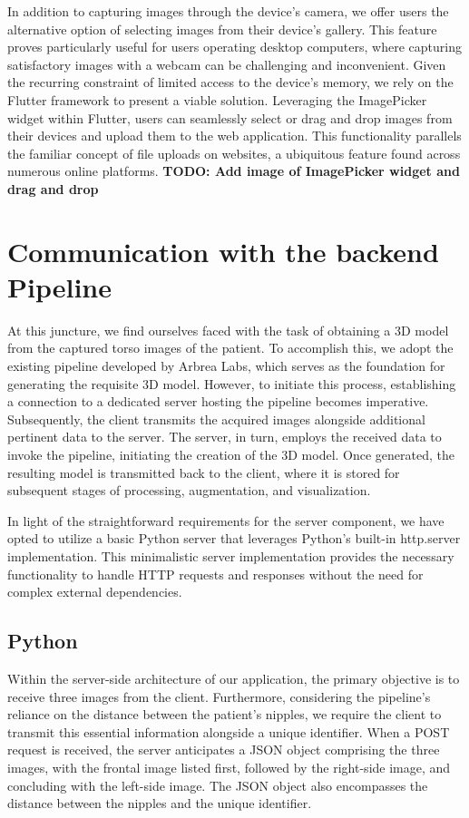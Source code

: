 In addition to capturing images through the device's camera, we offer users the alternative option of selecting images from their device's gallery. This feature proves particularly useful 
for users operating desktop computers, where capturing satisfactory images with a webcam can be challenging and inconvenient. Given the recurring constraint of limited access to the device's memory, 
we rely on the Flutter framework to present a viable solution. Leveraging the ImagePicker widget within Flutter, users can seamlessly select or drag and drop images from their devices 
and upload them to the web application. This functionality parallels the familiar concept of file uploads on websites, a ubiquitous feature found across numerous online platforms. 
\textbf{TODO: Add image of ImagePicker widget and drag and drop}

\section{Communication with the backend Pipeline}

At this juncture, we find ourselves faced with the task of obtaining a 3D model from the captured torso images of the patient. To accomplish this, we adopt the existing pipeline developed by Arbrea Labs, 
which serves as the foundation for generating the requisite 3D model. However, to initiate this process, establishing a connection to a dedicated server hosting the pipeline becomes imperative. 
Subsequently, the client transmits the acquired images alongside additional pertinent data to the server. The server, in turn, employs the received data to invoke the pipeline, 
initiating the creation of the 3D model. Once generated, the resulting model is transmitted back to the client, where it is stored for subsequent stages of processing, augmentation, and visualization.

In light of the straightforward requirements for the server component, we have opted to utilize a basic Python server that leverages Python's built-in http.server implementation. 
This minimalistic server implementation provides the necessary functionality to handle HTTP requests and responses without the need for complex external dependencies.

\subsection{Python}

Within the server-side architecture of our application, the primary objective is to receive three images from the client. Furthermore, considering the pipeline's reliance on the distance 
between the patient's nipples, we require the client to transmit this essential information alongside a unique identifier. When a POST request is received, the server anticipates a JSON object 
comprising the three images, with the frontal image listed first, followed by the right-side image, and concluding with the left-side image. The JSON object also encompasses the distance 
between the nipples and the unique identifier.

